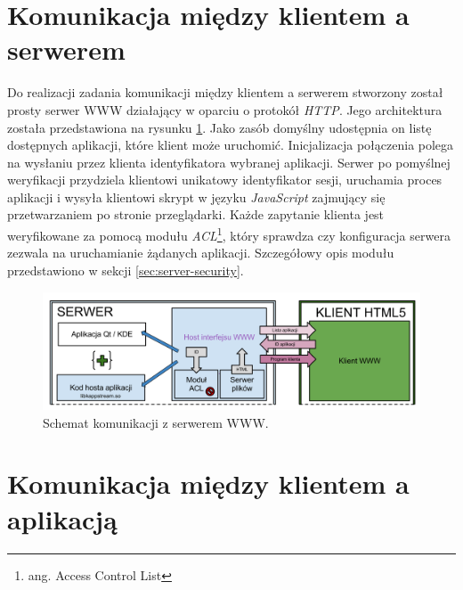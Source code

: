 \section{Komunikacja między klientem a serwerem}

Do realizacji zadania komunikacji między klientem a serwerem stworzony został prosty serwer WWW działający w oparciu o protokół \emph{HTTP}. Jego architektura została przedstawiona na rysunku \ref{fig:arch-www}. Jako zasób domyślny udostępnia on listę dostępnych aplikacji, które klient może uruchomić. Inicjalizacja połączenia polega na wysłaniu przez klienta identyfikatora wybranej aplikacji. Serwer po pomyślnej weryfikacji przydziela klientowi unikatowy identyfikator sesji, uruchamia proces aplikacji i wysyła klientowi skrypt w języku \emph{JavaScript} zajmujący się przetwarzaniem po stronie przeglądarki. Każde zapytanie klienta jest weryfikowane za pomocą modułu \emph{ACL}\footnote{ang. Access Control List}, który sprawdza czy konfiguracja serwera zezwala na uruchamianie żądanych aplikacji. Szczegółowy opis modułu przedstawiono w sekcji \ref{sec:server-security}.

\begin{figure}[H]
\centering
\includegraphics[width=1.0\linewidth]{img/arch-www}
\caption{Schemat komunikacji z serwerem WWW.}
\label{fig:arch-www}
\end{figure}

\section{Komunikacja między klientem a aplikacją}

